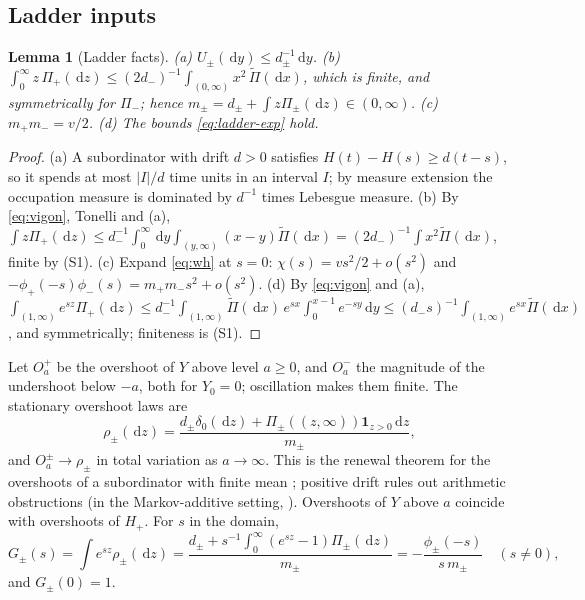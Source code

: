 \documentclass[11pt,a4paper]{article}
\newtheorem{lemma}[theorem]{Lemma}
\theoremstyle{definition}
\theoremstyle{remark}
\newcommand{\1}{\mathbf 1}
\newcommand{\dd}{\,\mathrm d}
\begin{document}
\subsection{Ladder inputs}
\begin{lemma}[Ladder facts]\label{lem:ladder}
(a) $U_\pm(\dd y)\le d_\pm^{-1}\dd y$. (b) $\int_0^\infty z\,\Pi_+(\dd z)\le(2d_-)^{-1}\int_{(0,\infty)}x^2\,\widetilde\Pi(\dd x)$, which is finite, and symmetrically for $\Pi_-$; hence $m_\pm=d_\pm+\int z\Pi_\pm(\dd z)\in(0,\infty)$. (c) $m_+m_-=v/2$. (d) The bounds \eqref{eq:ladder-exp} hold.
\end{lemma}
\begin{proof}
(a) A subordinator with drift $d>0$ satisfies $H(t)-H(s)\ge d(t-s)$, so it spends at most $|I|/d$ time units in an interval $I$; by measure extension the occupation measure is dominated by $d^{-1}$ times Lebesgue measure. (b) By \eqref{eq:vigon}, Tonelli and (a), $\int z\Pi_+(\dd z)\le d_-^{-1}\int_0^\infty\dd y\int_{(y,\infty)}(x-y)\widetilde\Pi(\dd x)=(2d_-)^{-1}\int x^2\widetilde\Pi(\dd x)$, finite by (S1). (c) Expand \eqref{eq:wh} at $s=0$: $\chi(s)=vs^2/2+o(s^2)$ and $-\phi_+(-s)\phi_-(s)=m_+m_-s^2+o(s^2)$. (d) By \eqref{eq:vigon} and (a), $\int_{(1,\infty)}e^{sz}\Pi_+(\dd z)\le d_-^{-1}\int_{(1,\infty)}\widetilde\Pi(\dd x)\,e^{sx}\int_0^{x-1}e^{-sy}\dd y\le(d_-s)^{-1}\int_{(1,\infty)}e^{sx}\widetilde\Pi(\dd x)$, and symmetrically; finiteness is (S1).
\end{proof}

Let $O_a^+$ be the overshoot of $Y$ above level $a\ge0$, and $O_a^-$ the magnitude of the undershoot below $-a$, both for $Y_0=0$; oscillation makes them finite. The stationary overshoot laws are
\begin{equation}\label{eq:stationary-overshoot}
 \rho_\pm(\dd z)=\frac{d_\pm\delta_0(\dd z)+\Pi_\pm((z,\infty))\1_{z>0}\dd z}{m_\pm},
\end{equation}
and $O_a^\pm\to\rho_\pm$ in total variation as $a\to\infty$. This is the renewal theorem for the overshoots of a subordinator with finite mean \cite{bvhs,bertoinbook}; positive drift rules out arithmetic obstructions (in the Markov-additive setting, \cite[Theorem 3.3, Proposition 3.8 and Theorem 3.10]{doring}). Overshoots of $Y$ above $a$ coincide with overshoots of $H_+$. For $s$ in the domain,
\begin{equation}\label{eq:G-factor}
 G_\pm(s)=\int e^{sz}\rho_\pm(\dd z)=\frac{d_\pm+s^{-1}\int_0^\infty(e^{sz}-1)\Pi_\pm(\dd z)}{m_\pm}=-\frac{\phi_\pm(-s)}{s\,m_\pm}\quad(s\ne0),
\end{equation}
and $G_\pm(0)=1$.
\end{document}
